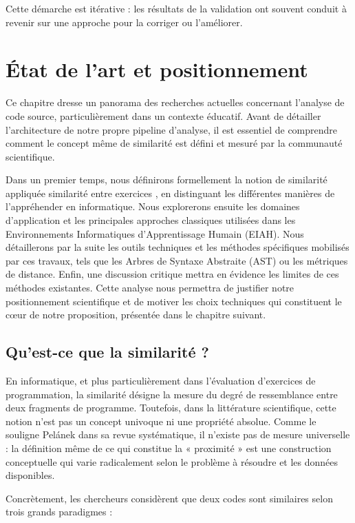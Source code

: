 \documentclass[12pt,a4paper,oneside]{report}
\begin{document}
Cette démarche est itérative : les résultats de la validation ont souvent
conduit à revenir sur une approche pour la corriger ou l'améliorer.


\chapter{État de l'art et positionnement}

Ce chapitre dresse un panorama des recherches actuelles concernant l'analyse de 
code source, particulièrement dans un contexte éducatif. Avant de détailler 
l'architecture de notre propre pipeline d'analyse, il est essentiel de comprendre
 comment le concept même de similarité est défini et mesuré par la communauté 
 scientifique. 

Dans un premier temps, nous définirons formellement la notion de similarité 
appliquée similarité entre exercices , en distinguant les différentes manières 
de l'appréhender en informatique. Nous explorerons ensuite les domaines d'application et les 
principales approches classiques utilisées dans les Environnements Informatiques
d'Apprentissage Humain (EIAH). Nous détaillerons par la suite les outils techniques et 
les méthodes spécifiques mobilisés par ces travaux, tels que les Arbres de Syntaxe Abstraite (AST)
ou les métriques de distance. Enfin, une discussion critique mettra en évidence 
les limites de ces méthodes existantes. Cette analyse nous permettra de justifier
notre positionnement scientifique et de motiver les choix techniques qui 
constituent le cœur de notre proposition, présentée dans le chapitre suivant.

\section{Qu'est-ce que la similarité ?}

En informatique, et plus particulièrement dans l'évaluation d'exercices de programmation, la similarité désigne la mesure du degré de ressemblance entre deux fragments de programme. Toutefois, dans la littérature scientifique, cette notion n'est pas un concept univoque ni une propriété absolue. Comme le souligne Pelánek \cite{pelanek_2020} dans sa revue systématique, il n'existe pas de mesure universelle : la définition même de ce qui constitue la « proximité » est une construction conceptuelle qui varie radicalement selon le problème à résoudre et les données disponibles.

 Concrètement, les chercheurs considèrent que deux codes sont similaires selon trois grands paradigmes :
\end{document}
